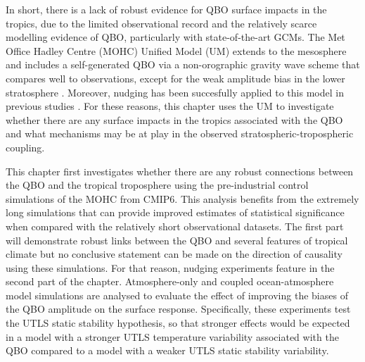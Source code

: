In short, there is a lack of robust evidence for QBO surface impacts in the tropics, due to the limited observational record and the relatively scarce modelling evidence of QBO, particularly with state-of-the-art GCMs. 
 The Met Office Hadley Centre (MOHC) Unified Model (UM) extends to the mesosphere and includes a self-generated QBO via a non-orographic gravity wave scheme that compares well to observations, except for the weak amplitude bias in the lower stratosphere \citep{richter2020}. Moreover, nudging has been succesfully applied to this model in previous studies \citep{telford2008description,gray2020}. For these reasons, this chapter uses the UM to investigate whether there are any surface impacts in the tropics associated with the QBO and what mechanisms may be at play in the observed stratospheric-tropospheric coupling.



This chapter first investigates whether there are any robust connections between the QBO and the tropical troposphere using the pre-industrial control simulations of the MOHC from CMIP6.  This analysis benefits from the extremely long simulations that can provide improved estimates of statistical significance when compared with the relatively short observational datasets. The first part will demonstrate robust links between the QBO and several features of tropical climate but no conclusive statement can be made on the direction of causality using these simulations. For that reason, nudging experiments feature in the second part of the chapter. Atmosphere-only and coupled ocean-atmosphere model simulations are analysed to evaluate the effect of improving the biases of the QBO amplitude on the surface response. Specifically, these experiments test the UTLS static stability hypothesis, so that stronger effects would be expected in a model with a stronger UTLS temperature variability associated with the QBO compared to a model with a weaker UTLS static stability variability.

